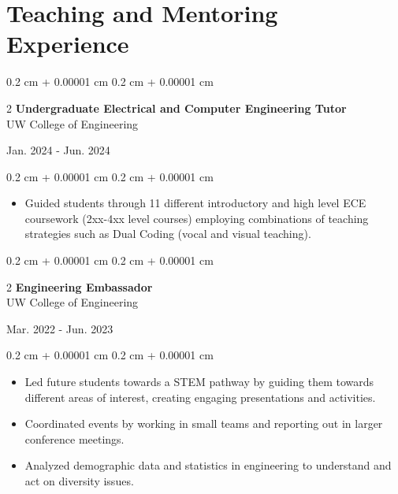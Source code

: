 \documentclass[10pt, letterpaper]{article}
\newenvironment{highlightsforbulletentries}{
    \begin{itemize}[
        topsep=0.10 cm,
        parsep=0.10 cm,
        partopsep=0pt,
        itemsep=0pt,
        leftmargin=10pt
    ]
}{
    \end{itemize}
} %
\newenvironment{onecolentry}{
    \begin{adjustwidth}{
        0.2 cm + 0.00001 cm
    }{
        0.2 cm + 0.00001 cm
    }
}{
    \end{adjustwidth}
} %
\newenvironment{twocolentry}[2][]{
    \onecolentry
    \def\secondColumn{#2}
    \setcolumnwidth{\fill, 4.5 cm}
    \begin{paracol}{2}
}{
    \switchcolumn \raggedleft \secondColumn
    \end{paracol}
    \endonecolentry
} %
\begin{document}
    \section{Teaching and Mentoring Experience}
        \begin{twocolentry}{
            Jan. 2024 - Jun. 2024
        }{
            \textbf{Undergraduate Electrical and Computer Engineering Tutor}\\
            UW College of Engineering
        }
        \end{twocolentry}
        \vspace{0.1 cm}
        \begin{onecolentry}
            \begin{highlightsforbulletentries}
                \item Guided students through 11 different introductory and high level ECE coursework (2xx-4xx level
                courses) employing combinations of teaching strategies such as Dual Coding (vocal and visual teaching).
            \end{highlightsforbulletentries}
        \end{onecolentry}

        \vspace{0.2 cm}

        \begin{twocolentry}{
            Mar. 2022 - Jun. 2023
        }{
            \textbf{Engineering Embassador}\\
            UW College of Engineering
        }
        \end{twocolentry}
        \vspace{0.1 cm}
        \begin{onecolentry}
            \begin{highlightsforbulletentries}
                \item Led future students towards a STEM pathway by guiding them towards different areas of interest,
                creating engaging presentations and activities.
                \item Coordinated events by working in small teams and reporting out in larger conference meetings.
                \item Analyzed demographic data and statistics in engineering to understand and act on diversity issues.
            \end{highlightsforbulletentries}
        \end{onecolentry}
\end{document}
